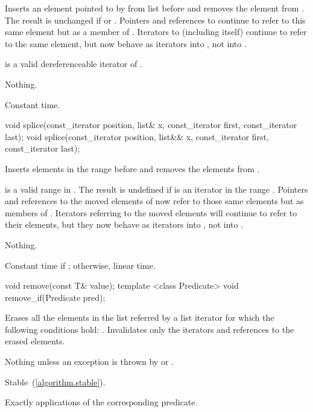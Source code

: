 \begin{itemdescr}
\pnum
\effects
Inserts an element pointed to by
from list
before  and removes the element from
.
The result is unchanged if
or
.
Pointers and references to
continue to refer to this same element but as a member of
.
Iterators
to
(including
itself) continue to refer to the same element, but now behave as iterators into
,
not into
.

\pnum
\requires
{}
is a valid dereferenceable iterator of
.

\pnum
\throws Nothing.

\pnum
\complexity
Constant time.
\end{itemdescr}

%
%
\begin{itemdecl}
void splice(const_iterator position, list& x, const_iterator first,
            const_iterator last);
void splice(const_iterator position, list&& x, const_iterator first,
            const_iterator last);
\end{itemdecl}

\begin{itemdescr}
\pnum
\effects
Inserts elements in the range
before
and removes the elements from
.

\pnum
\requires
\tcode{[first, last)}
is a valid range in
.
The result is undefined if
is an iterator in the range
.
Pointers and references to the moved elements of
now refer to those same elements but as members of
.
Iterators referring to the moved elements will continue to refer to their
elements, but they now behave as iterators into
,
not into
.

\pnum
\throws Nothing.

\pnum
\complexity
Constant time if
;
otherwise, linear time.
\end{itemdescr}

%
\begin{itemdecl}
void remove(const T& value);
template <class Predicate> void remove_if(Predicate pred);
\end{itemdecl}

\begin{itemdescr}
\pnum
\effects
Erases all the elements in the list referred by a list iterator  for which the
following conditions hold: .
Invalidates only the iterators and references to the erased elements.

\pnum
\throws
Nothing unless an exception is thrown by
or
.

\pnum
\remarks Stable~(\ref{algorithm.stable}).

\pnum
\complexity
Exactly
applications of the corresponding predicate.
\end{itemdescr}

